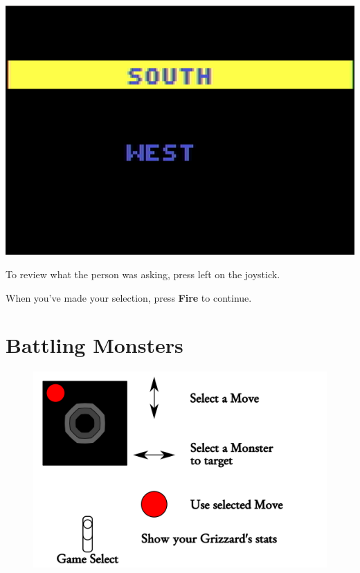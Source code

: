 \documentclass[10pt,twocolumn,openany,article]{memoir}
\begin{document}
\begin{center}
  \includegraphics[width=\columnwidth]{../Manual/InquireNTSC.png}
\end{center}

To review  what  the  person  was  asking, press  left  on
the joystick.

When you've made your selection, press \textbf{Fire} to continue.

\ifdefined\ATARIAGESAVE
\pagebreak
\fi

\section{Battling Monsters}

\begin{figure}[t]
  \includegraphics[width=2\columnwidth]{../Manual/CombatControls.png}
\end{figure}
\end{document}
